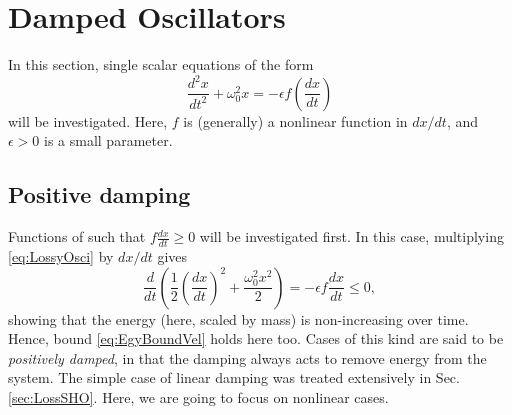 \documentclass[11pt,twoside,a4paper,english]{book}
\begin{document}
\section{Damped Oscillators}


In this section, single scalar equations of the form 
\begin{equation}\label{eq:LossyOsci}
\frac{d^2 x}{dt^2}+\omega_0^2 x = -\epsilon f\left(\frac{dx}{dt}\right)
\end{equation}
will be investigated. Here, $f$ is (generally) a nonlinear function in $dx/dt$, and $\epsilon > 0$ is a small parameter. 


\subsection{Positive damping}

Functions of such that $f\frac{dx}{dt}\geq 0$ will be investigated first. In this case, multiplying \eqref{eq:LossyOsci} by $dx/dt$ gives
\begin{equation}
\frac{d}{dt}\left(\frac{1}{2}\left(\frac{dx}{dt}\right)^2 +  \frac{\omega_0^2 x^2}{2} \right) = - \epsilon f\frac{dx}{dt} \leq 0,  
\end{equation}
showing that the energy (here, scaled by mass) is non-increasing over time. Hence, bound \eqref{eq:EgyBoundVel} holds here too. Cases of this kind are said to be \emph{positively damped}, in that the damping always acts to remove energy from the system.
The simple case of linear damping was treated extensively in Sec. \ref{sec:LossSHO}. Here, we are going to focus on nonlinear cases. 
\end{document}
